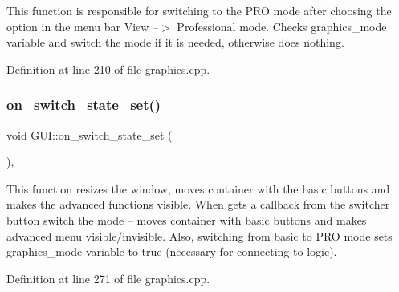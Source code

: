 This function is responsible for switching to the P\+RO mode after choosing the option in the menu bar View –$>$ Professional mode. Checks graphics\+\_\+mode variable and switch the mode if it is needed, otherwise does nothing. 



Definition at line 210 of file graphics.\+cpp.


\begin{DoxyCode}{0}

\end{DoxyCode}
\mbox{\label{class_g_u_i_a89703c7bb0f5b09a4605b70e6636e509}} 
\subsubsection{\texorpdfstring{on\_switch\_state\_set()}{on\_switch\_state\_set()}}
{\footnotesize\ttfamily void G\+U\+I\+::on\+\_\+switch\+\_\+state\+\_\+set (\begin{DoxyParamCaption}{ }\end{DoxyParamCaption})\hspace{0.3cm}{\ttfamily [static]}, {\ttfamily [protected]}}



This function resizes the window, moves container with the basic buttons and makes the advanced functions visible. When gets a callback from the switcher button switch the mode – moves container with basic buttons and makes advanced menu visible/invisible. Also, switching from basic to P\+RO mode sets graphics\+\_\+mode variable to true (necessary for connecting to logic). 



Definition at line 271 of file graphics.\+cpp.


